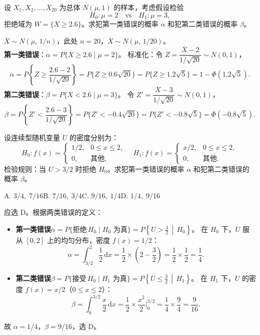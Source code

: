 \documentclass[lang=cn,11pt]{elegantbook}
\begin{document}
\begin{exercise}[正态总体两类错误的计算] \label{ex:error_normal}
设 \(X_1,X_2,\dots,X_{20}\) 为总体 \(N(\mu,1)\) 的样本，考虑假设检验
\[
H_0\colon\mu=2\quad\text{vs}\quad H_1\colon\mu=3,
\]
拒绝域为 \(W=\{\overline{X}\geq 2.6\}\)。求犯第一类错误的概率 \(\alpha\) 和犯第二类错误的概率 \(\beta\)。
\end{exercise}
\begin{solution}
\(\overline{X}\sim N(\mu,\,1/n)\)，此处 \(n=20\)，\(\overline{X}\sim N(\mu,\,1/20)\)。\\
\textbf{第一类错误}：\(\alpha=P\{\overline{X}\geq2.6\mid\mu=2\}\)。
标准化：令 \(Z=\dfrac{\overline{X}-2}{1/\sqrt{20}}\sim N(0,1)\)，
\[
\alpha=P\!\left\{Z\geq\frac{2.6-2}{1/\sqrt{20}}\right\}=P\{Z\geq 0.6\sqrt{20}\}=P\{Z\geq 1.2\sqrt{5}\}=1-\Phi(1.2\sqrt{5}).
\]
\textbf{第二类错误}：\(\beta=P\{\overline{X}<2.6\mid\mu=3\}\)。
令 \(Z'=\dfrac{\overline{X}-3}{1/\sqrt{20}}\sim N(0,1)\)，
\[
\beta=P\!\left\{Z'<\frac{2.6-3}{1/\sqrt{20}}\right\}=P\{Z'<-0.4\sqrt{20}\}=P\{Z'<-0.8\sqrt{5}\}=\Phi(-0.8\sqrt{5}).
\]
\end{solution}


\begin{exercise}\label{exer:9-error-calc}
设连续型随机变量 \(U\) 的密度分别为：
\[
H_0\colon f(x)=\begin{cases}1/2, & 0\leq x\leq2,\\0, & \text{其他},\end{cases}
\quad
H_1\colon f(x)=\begin{cases}x/2, & 0\leq x\leq2,\\0, & \text{其他}.\end{cases}
\]
检验规则：当 \(U>3/2\) 时拒绝 \(H_0\)。求犯第一类错误的概率 \(\alpha\) 和犯第二类错误的概率 \(\beta\)。\par
A. \(3/4,\;7/16\)\qquad B. \(7/16,\;3/4\)\qquad C. \(9/16,\;1/4\)\qquad D. \(1/4,\;9/16\)
\end{exercise}
\begin{solution}
应选 D。根据两类错误的定义：
\begin{itemize}
    \item \textbf{第一类错误}\(\alpha = P\{\text{拒绝}\,H_0 \mid H_0\text{ 为真}\} = P\!\left\{U>\tfrac{3}{2}\,\middle|\,H_0\right\}\)。
    在 \(H_0\) 下，\(U\) 服从 \([0,2]\) 上的均匀分布，密度 \(f(x)=1/2\)：
    \[
    \alpha = \int_{3/2}^{2}\frac{1}{2}\,\mathrm{d}x = \frac{1}{2}\times\left(2-\frac{3}{2}\right) = \frac{1}{2}\times\frac{1}{2} = \frac{1}{4}.
    \]
    \item \textbf{第二类错误}\(\beta = P\{\text{接受}\,H_0 \mid H_1\text{ 为真}\} = P\!\left\{U\leq\tfrac{3}{2}\,\middle|\,H_1\right\}\)。
    在 \(H_1\) 下，\(U\) 的密度 \(f(x)=x/2\)（\(0\leq x\leq2\)）：
    \[
    \beta = \int_0^{3/2}\frac{x}{2}\,\mathrm{d}x = \frac{1}{2}\times\frac{x^2}{2}\Bigg|_0^{3/2} = \frac{1}{4}\times\frac{9}{4} = \frac{9}{16}.
    \]
\end{itemize}
故 \(\alpha=1/4\)，\(\beta=9/16\)，选 D。
\end{solution}
\end{document}
